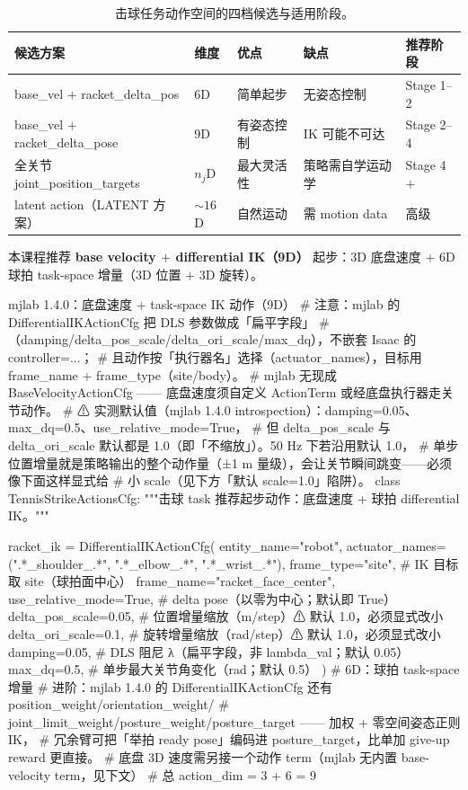 \begin{table}[H]
\centering
\small
\caption{击球任务动作空间的四档候选与适用阶段。}
\label{tab:rlmc-strike-actionspace}
\begin{tabular}{@{}lllll@{}}
\toprule
候选方案 & 维度 & 优点 & 缺点 & 推荐阶段 \\
\midrule
base\_vel $+$ racket\_delta\_pos & 6D & 简单起步 & 无姿态控制 & Stage 1--2 \\
base\_vel $+$ racket\_delta\_pose & 9D & 有姿态控制 & IK 可能不可达 & Stage 2--4 \\
全关节 joint\_position\_targets & $n_j$D & 最大灵活性 & 策略需自学运动学 & Stage 4$+$ \\
latent action（LATENT 方案） & $\sim 16$D & 自然运动 & 需 motion data & 高级 \\
\bottomrule
\end{tabular}
\end{table}

本课程推荐 \textbf{base velocity $+$ differential IK（9D）} 起步：3D 底盘速度 $+$ 6D 球拍 task-space 增量（3D 位置 $+$ 3D 旋转）。

\begin{codebox}[Python]{mjlab 1.4.0：底盘速度 $+$ task-space IK 动作（9D）}
# 注意：mjlab 的 DifferentialIKActionCfg 把 DLS 参数做成「扁平字段」
# （damping/delta_pos_scale/delta_ori_scale/max_dq），不嵌套 Isaac 的 controller=...；
# 且动作按「执行器名」选择（actuator_names），目标用 frame_name + frame_type（site/body）。
# mjlab 无现成 BaseVelocityActionCfg —— 底盘速度须自定义 ActionTerm 或经底盘执行器走关节动作。
# ⚠ 实测默认值（mjlab 1.4.0 introspection）：damping=0.05、max_dq=0.5、use_relative_mode=True，
#   但 delta_pos_scale 与 delta_ori_scale 默认都是 1.0（即「不缩放」）。50 Hz 下若沿用默认 1.0，
#   单步位置增量就是策略输出的整个动作量（±1 m 量级），会让关节瞬间跳变——必须像下面这样显式给
#   小 scale（见下方「默认 scale=1.0」陷阱）。
class TennisStrikeActionsCfg:
    """击球 task 推荐起步动作：底盘速度 + 球拍 differential IK。"""

    racket_ik = DifferentialIKActionCfg(
        entity_name="robot",
        actuator_names=(".*_shoulder_.*", ".*_elbow_.*", ".*_wrist_.*"),
        frame_type="site",                     # IK 目标取 site（球拍面中心）
        frame_name="racket_face_center",
        use_relative_mode=True,                # delta pose（以零为中心；默认即 True）
        delta_pos_scale=0.05,                  # 位置增量缩放（m/step）⚠ 默认 1.0，必须显式改小
        delta_ori_scale=0.1,                   # 旋转增量缩放（rad/step）⚠ 默认 1.0，必须显式改小
        damping=0.05,                          # DLS 阻尼 λ（扁平字段，非 lambda_val；默认 0.05）
        max_dq=0.5,                            # 单步最大关节角变化（rad；默认 0.5）
    )                                          # 6D：球拍 task-space 增量
    # 进阶：mjlab 1.4.0 的 DifferentialIKActionCfg 还有 position_weight/orientation_weight/
    #   joint_limit_weight/posture_weight/posture_target —— 加权 + 零空间姿态正则 IK，
    #   冗余臂可把「举拍 ready pose」编码进 posture_target，比单加 give-up reward 更直接。
    # 底盘 3D 速度需另接一个动作 term（mjlab 无内置 base-velocity term，见下文）
    # 总 action_dim = 3 + 6 = 9
\end{codebox}

